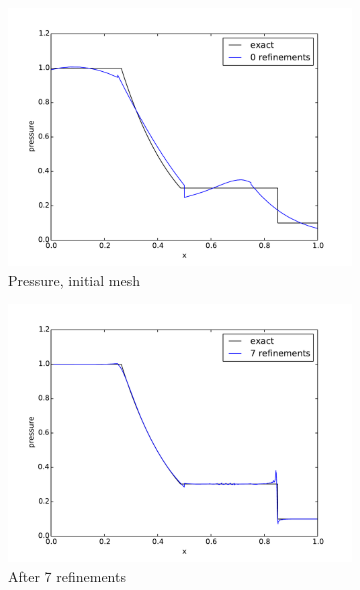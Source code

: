 \documentclass[preprint,12pt]{elsarticle}
\begin{document}
\begin{figure}[p]
\begin{subfigure}[c]{0.3\textwidth}
\includegraphics[width=\textwidth]{SpaceTimeCNS/Sod1e-5/pres1.pdf}
\caption{Pressure, initial mesh}
\label{fig:sod_pres0}
\end{subfigure}
\begin{subfigure}[c]{0.3\textwidth}
\centering
\includegraphics[width=\textwidth]{SpaceTimeCNS/Sod1e-5/pres8.pdf}
\caption{After 7 refinements}
\label{fig:sod_pres7}
\end{subfigure}
\begin{subfigure}[c]{0.3\textwidth}
\centering

\end{subfigure}
\end{figure}
\end{document}
